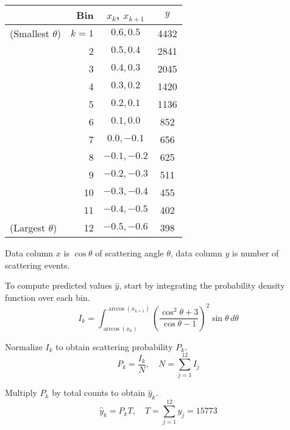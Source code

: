 \documentclass[12pt]{article}
\begin{document}
\begin{center}
\begin{tabular}{|lr|c|c|}
\hline
& Bin & $x_k$, $x_{k+1}$ & $y$\\
\hline
(Smallest $\theta$) & $k=1$ & $0.6, 0.5$ & 4432\\
& 2 & $0.5, 0.4$ & 2841\\
& 3 & $0.4, 0.3$ & 2045\\
& 4 & $0.3, 0.2$ & 1420\\
& 5 & $0.2, 0.1$ & 1136\\
& 6 & $0.1, 0.0$ & 852\\
& 7 & $0.0, -0.1$ & 656\\
& 8 & $-0.1, -0.2$ & 625\\
& 9 & $-0.2, -0.3$ & 511\\
& 10 & $-0.3, -0.4$ & 455\\
& 11 & $-0.4, -0.5$ & 402\\
(Largest $\theta$) & 12 & $-0.5, -0.6$ & 398\\
\hline
\end{tabular}
\end{center}

\noindent
Data column $x$ is $\cos\theta$ of scattering angle $\theta$,
data column $y$ is number of scattering events.

\bigskip
\noindent
To compute predicted values $\hat{y}$, start by integrating
the probability density function over each bin.
\begin{equation*}
I_k=\int_{\arccos(x_k)}^{\arccos(x_{k+1})}
\left(
\frac{\cos^2\theta+3}{\cos\theta-1}
\right)^2\sin\theta\,d\theta
\end{equation*}

\noindent
Normalize $I_k$ to obtain scattering probability $P_k$.
\begin{equation*}
P_k=\frac{I_k}{N},\quad N=\sum_{j=1}^{12}I_j
\end{equation*}

\noindent
Multiply $P_k$ by total counts to obtain $\hat{y}_k$.
\begin{equation*}
\hat{y}_k=P_k T,\quad T=\sum_{j=1}^{12}y_j=15773
\end{equation*}
\end{document}
